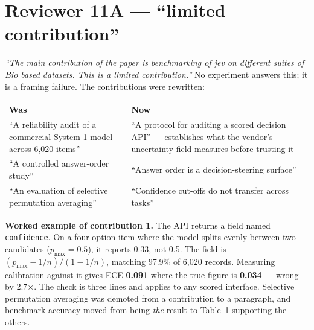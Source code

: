 \documentclass[11pt,a4paper]{article}
\newcommand{\key}[1]{\textcolor{hl}{\textbf{#1}}}
\begin{document}
\section{Reviewer 11A --- ``limited contribution''}
\emph{``The main contribution of the paper is benchmarking of jev on different suites of Bio based datasets. This is a limited contribution.''}
No experiment answers this; it is a framing failure. The contributions were rewritten:
\begin{center}\small\begin{tabular}{@{}p{7.3cm}p{7.3cm}@{}}\toprule\textbf{Was} & \textbf{Now} \\\midrule``A reliability audit of a commercial System-1 model across 6{,}020 items'' &``A protocol for auditing a scored decision API'' --- establishes what the vendor's uncertainty field measures before trusting it \\[4pt]``A controlled answer-order study'' &``Answer order is a decision-steering surface'' \\[4pt]``An evaluation of selective permutation averaging'' &``Confidence cut-offs do not transfer across tasks'' \\\bottomrule\end{tabular}\end{center}
\textbf{Worked example of contribution 1.} The API returns a field named \texttt{confidence}. On a four-option item where the model splits evenly between two candidates ($p_{\max}=0.5$){,} it reports 0.33{,} not 0.5. The field is $(p_{\max}-1/n)/(1-1/n)${,} matching 97.9\% of 6{,}020 records. Measuring calibration against it gives ECE \key{0.091} where the true figure is \key{0.034} --- wrong by 2.7$\times$. The check is three lines and applies to any scored interface.
Selective permutation averaging was demoted from a contribution to a paragraph, and benchmark accuracy moved from being \emph{the} result to Table~1 supporting the others.
\end{document}
